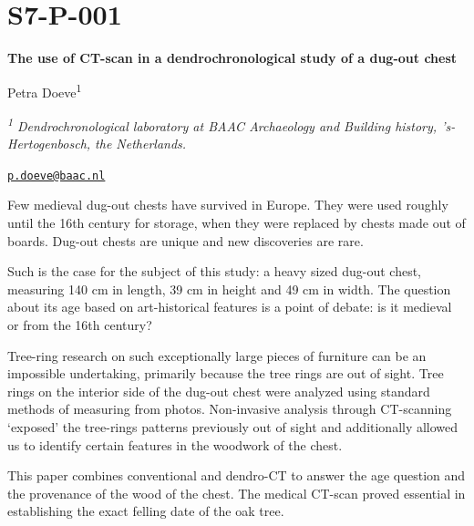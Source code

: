 \documentclass[
]{book}
\begin{document}
\hypertarget{s7-p-001}{%
\section*{S7-P-001}\label{s7-p-001}}

\textbf{The use of CT-scan in a dendrochronological study of a dug-out chest}

Petra Doeve\textsuperscript{1}

\emph{\textsuperscript{1} Dendrochronological laboratory at BAAC Archaeology and Building history, 's-Hertogenbosch, the Netherlands.}

\href{mailto:p.doeve@baac.nl}{\nolinkurl{p.doeve@baac.nl}}

Few medieval dug-out chests have survived in Europe. They were used roughly until the 16th century for storage, when they were replaced by chests made out of boards. Dug-out chests are unique and new discoveries are rare.

Such is the case for the subject of this study: a heavy sized dug-out chest, measuring 140 cm in length, 39 cm in height and 49 cm in width. The question about its age based on art-historical features is a point of debate: is it medieval or from the 16th century?

Tree-ring research on such exceptionally large pieces of furniture can be an impossible undertaking, primarily because the tree rings are out of sight. Tree rings on the interior side of the dug-out chest were analyzed using standard methods of measuring from photos. Non-invasive analysis through CT-scanning `exposed' the tree-rings patterns previously out of sight and additionally allowed us to identify certain features in the woodwork of the chest.

This paper combines conventional and dendro-CT to answer the age question and the provenance of the wood of the chest. The medical CT-scan proved essential in establishing the exact felling date of the oak tree.
\end{document}
